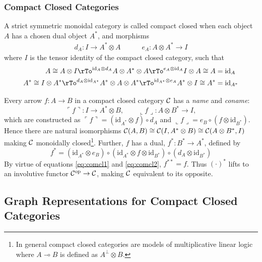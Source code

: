 \documentclass[runningheads]{llncs}
\newcommand{\iso}{\cong}
\newcommand{\name}[1]{%
\ulcorner #1 \urcorner}
\newcommand{\coname}[1]{%
\llcorner #1 \lrcorner}
\newcommand{\catC}{\ensuremath{{\cal C}}\xspace}
\newcommand{\id}[1]{\ensuremath{\mathrm{id}_{#1}}}
\begin{document}
\subsubsection*{Compact Closed Categories}

\begin{definition}
\label{compactcat-def}
A strict symmetric monoidal  category
\cite{MacLane:CatsWM:1971,AspLon:CatTypStruct:1991} is called compact 
closed \cite{KelLap:comcl:1980} when each object $A$ has a chosen dual
object $A^*$, and morphisms
\begin{gather*}
  d_A : I \to A^* \otimes A \quad\quad\quad e_A : A \otimes A^* \to I
\end{gather*}
where $I$ is the tensor identity of the compact closed category, such
that
\begin{align}
  A \iso A \otimes I \rTo^{\id{A} \otimes d_A} A \otimes A^* \otimes A
  \rTo^{e_A \otimes \id{A}} I \otimes A \iso A & = \id{A} \label{eq:comcl1}\\
  A^* \iso I \otimes A^* \rTo^{ d_A \otimes \id{A^*}} A^* \otimes A
  \otimes A^* \rTo^{\id{A^*} \otimes e_A} A^* \otimes I \iso A^* & =
  \id{A^*} \label{eq:comcl2}
\end{align}
\end{definition}

Every arrow $f:A\to B$ in a compact closed category \catC
has a \emph{name} and \emph{coname}:
\[
\name{f} : I \to A^* \otimes B, \qquad \coname{f} : A \otimes  B^* \to I,
\]
which are constructed as $\name{f} = (\id{A^*}\otimes f) \circ d_A$ and
$\coname{f} = e_B \circ (f \otimes \id{B^*})$.  Hence there are natural
isomorphisms $\catC(A,B) \iso \catC(I,A^*\otimes B) \iso
\catC(A\otimes B^*,I)$ making \catC monoidally closed\footnote{In
  general compact closed categories  are models of multiplicative
  linear logic where $A \multimap B$ is defined as $A^\bot \otimes B$.}.
Further,  $f$ has a dual, $f^* : B^* \to A^*$, defined by 
\[
f^* = (\id{A^*} \otimes e_B) \circ (\id{A^*}\otimes f \otimes
\id{B^*}) \circ (d_A \otimes \id{B^*})
\]
By virtue of equations \eqref{eq:comcl1} and \eqref{eq:comcl2}, $f^{**} =
f$.  Thus $(\cdot)^*$ lifts to an involutive functor
$\catC^{\text{op}} \to \catC$,  making $\catC$ equivalent to its
opposite.

\subsection{Graph Representations for Compact Closed Categories}
\label{sec:graph-repr-comp}
\end{document}
